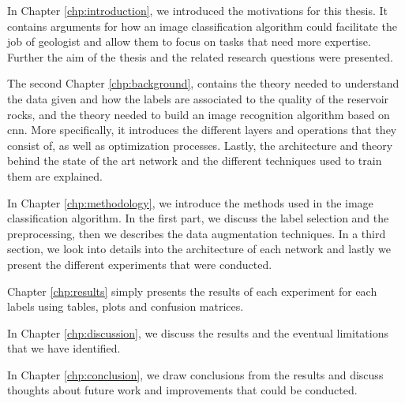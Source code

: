 In Chapter \ref{chp:introduction}, we introduced the motivations for this thesis. It contains arguments for how an image classification algorithm could facilitate the job of geologist and allow them to focus on tasks that need more expertise. Further the aim of the thesis and the related research questions were presented. 


The second Chapter \ref{chp:background}, contains the theory needed to understand the data given and how the labels are associated to the quality of the reservoir rocks, and the theory needed to build an image recognition algorithm based on \gls{cnn}. More specifically, it introduces the different layers and operations that they consist of, as well as optimization processes. Lastly, the architecture and theory behind the state of the art network and the different techniques used to train them are explained.
 

In Chapter \ref{chp:methodology}, we introduce the methods used in the image classification algorithm. In the first part, we discuss the label selection and the preprocessing, then we describes the data augmentation techniques. In a third section, we look into details into the architecture of each network and lastly we present the different experiments that were conducted.  


Chapter \ref{chp:results} simply presents the results of each experiment for each labels using tables, plots and confusion matrices.


In Chapter \ref{chp:discussion}, we discuss the results and the eventual limitations that we have identified.


In Chapter \ref{chp:conclusion}, we draw conclusions from the results and discuss thoughts about future work and improvements that could be conducted. 
